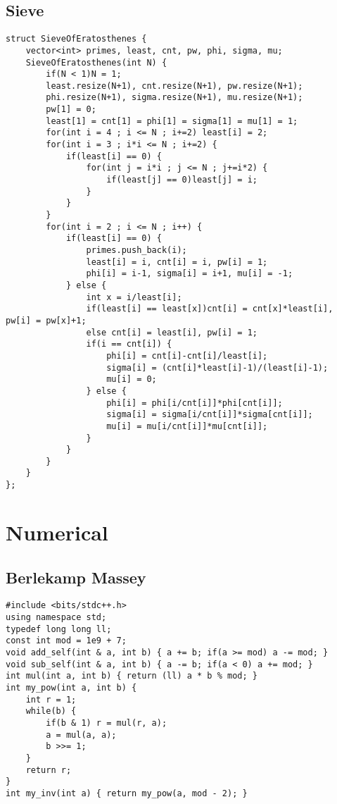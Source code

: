 \documentclass[landscape, 8pt, a4paper, oneside]{extarticle}
\begin{document}
\begin{multicols}{3}
\subsection{Sieve}
\begin{verbatim}
struct SieveOfEratosthenes {
    vector<int> primes, least, cnt, pw, phi, sigma, mu;
    SieveOfEratosthenes(int N) {
        if(N < 1)N = 1;
        least.resize(N+1), cnt.resize(N+1), pw.resize(N+1);
        phi.resize(N+1), sigma.resize(N+1), mu.resize(N+1);
        pw[1] = 0;
        least[1] = cnt[1] = phi[1] = sigma[1] = mu[1] = 1;
        for(int i = 4 ; i <= N ; i+=2) least[i] = 2;
        for(int i = 3 ; i*i <= N ; i+=2) {
            if(least[i] == 0) {
                for(int j = i*i ; j <= N ; j+=i*2) {
                    if(least[j] == 0)least[j] = i;
                }
            }
        }
        for(int i = 2 ; i <= N ; i++) {
            if(least[i] == 0) {
                primes.push_back(i);
                least[i] = i, cnt[i] = i, pw[i] = 1;
                phi[i] = i-1, sigma[i] = i+1, mu[i] = -1;
            } else {
                int x = i/least[i];
                if(least[i] == least[x])cnt[i] = cnt[x]*least[i], pw[i] = pw[x]+1;
                else cnt[i] = least[i], pw[i] = 1;
                if(i == cnt[i]) {
                    phi[i] = cnt[i]-cnt[i]/least[i];
                    sigma[i] = (cnt[i]*least[i]-1)/(least[i]-1);
                    mu[i] = 0;
                } else {
                    phi[i] = phi[i/cnt[i]]*phi[cnt[i]];
                    sigma[i] = sigma[i/cnt[i]]*sigma[cnt[i]];
                    mu[i] = mu[i/cnt[i]]*mu[cnt[i]];
                }
            }
        }
    }
};
\end{verbatim}
\section{Numerical}
\subsection{Berlekamp Massey}
\begin{verbatim}
#include <bits/stdc++.h>
using namespace std;
typedef long long ll;
const int mod = 1e9 + 7;
void add_self(int & a, int b) { a += b; if(a >= mod) a -= mod; }
void sub_self(int & a, int b) { a -= b; if(a < 0) a += mod; }
int mul(int a, int b) { return (ll) a * b % mod; }
int my_pow(int a, int b) {
    int r = 1;
    while(b) {
        if(b & 1) r = mul(r, a);
        a = mul(a, a);
        b >>= 1;
    }
    return r;
}
int my_inv(int a) { return my_pow(a, mod - 2); }
 

\end{verbatim}
\end{multicols}
\end{document}
